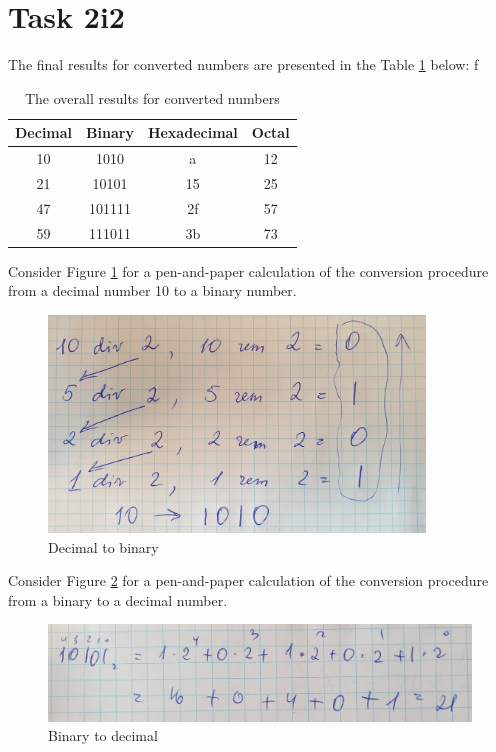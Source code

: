 \documentclass{article}
\begin{document}
\section{Task 2i2}
The final results for converted numbers are presented in the Table \ref{output2} below:
f\begin{table}[h!]
\begin{center}
\begin{tabular}{|c|c|c|c|}
 \hline
Decimal & Binary &Hexadecimal & Octal  \\
 \hline
 10  & 1010  & a & 12  \\
  \hline
  21 & 10101 & 15 & 25  \\
 \hline
47  &101111  &2f & 57  \\
 \hline
59 & 111011  &3b & 73  \\
  \hline
\end{tabular}
\end{center}
 \caption{The overall results for converted numbers}
 \label{output2}
\end{table}
\newline
Consider Figure \ref{output3} for a pen-and-paper calculation of the conversion procedure from a decimal number 10 to a binary number.
\begin{figure}[h!]
  \centering
 \includegraphics [width=10cm]{Decimal_to_binary.jpg}
 \caption{Decimal to binary}
 \label{output3}
\end{figure}
\newline
Consider Figure \ref{output4} for a pen-and-paper calculation of the conversion procedure from a binary to a decimal number.
\begin{figure}[h!]
  \centering
 \includegraphics[scale=0.1]{Binary_to_decimal.jpg}
 \caption{Binary to decimal}
 \label{output4}
\end{figure}
\end{document}
